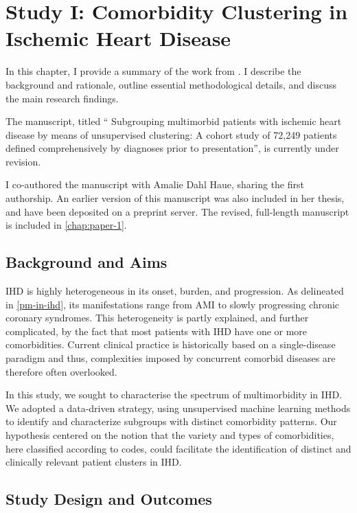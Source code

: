 \chapter{Study I: Comorbidity Clustering in Ischemic Heart Disease}
\label{chap:study1-outline}

In this chapter, I provide a summary of the work from \studyi{}.
I describe the background and rationale,
outline essential methodological details,
and discuss the main research findings.

The manuscript, titled \enquote{%
Subgrouping multimorbid patients with ischemic heart disease by
means of unsupervised clustering: A cohort study of 72,249
patients defined comprehensively by diagnoses prior to
presentation}, is currently under revision.

I co-authored the manuscript with Amalie Dahl Haue,
sharing the first authorship.
An earlier version of this manuscript was also included in 
her thesis, and have been deposited on a preprint server. 
\autocite{haueSubgrouping2023}
The revised, full-length manuscript is included in 
\cref{chap:paper-1}.

\section{Background and Aims}

\Ac{IHD} is highly heterogeneous in its onset, burden, and progression.
As delineated in \cref{pm-in-ihd}, its manifestations range from 
\ac{AMI} to slowly progressing chronic coronary syndromes.
This heterogeneity is partly explained, and further complicated,
by the fact that most patients with \ac{IHD} have one or more 
comorbidities.
Current clinical practice is historically based on a single-disease paradigm
and thus, complexities imposed by concurrent comorbid diseases are therefore 
often overlooked.
~\autocite{formanMultimorbidity2018}

In this study, we sought to characterise the spectrum of multimorbidity
in \ac{IHD}. 
We adopted a data-driven strategy, using unsupervised machine learning
methods to identify and characterize subgroups 
with distinct comorbidity patterns. 
Our hypothesis centered on the notion that the 
variety and types of comorbidities,
here classified according to  codes, 
could facilitate the identification of distinct and clinically relevant 
patient clusters in \ac{IHD}.

\section{Study Design and Outcomes}

